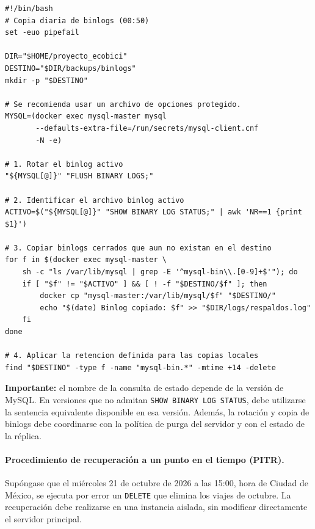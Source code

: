 \documentclass[10pt,a4paper]{article}
\begin{document}
\begin{lstlisting}
#!/bin/bash
# Copia diaria de binlogs (00:50)
set -euo pipefail

DIR="$HOME/proyecto_ecobici"
DESTINO="$DIR/backups/binlogs"
mkdir -p "$DESTINO"

# Se recomienda usar un archivo de opciones protegido.
MYSQL=(docker exec mysql-master mysql
       --defaults-extra-file=/run/secrets/mysql-client.cnf
       -N -e)

# 1. Rotar el binlog activo
"${MYSQL[@]}" "FLUSH BINARY LOGS;"

# 2. Identificar el archivo binlog activo
ACTIVO=$("${MYSQL[@]}" "SHOW BINARY LOG STATUS;" | awk 'NR==1 {print $1}')

# 3. Copiar binlogs cerrados que aun no existan en el destino
for f in $(docker exec mysql-master \
    sh -c "ls /var/lib/mysql | grep -E '^mysql-bin\\.[0-9]+$'"); do
    if [ "$f" != "$ACTIVO" ] && [ ! -f "$DESTINO/$f" ]; then
        docker cp "mysql-master:/var/lib/mysql/$f" "$DESTINO/"
        echo "$(date) Binlog copiado: $f" >> "$DIR/logs/respaldos.log"
    fi
done

# 4. Aplicar la retencion definida para las copias locales
find "$DESTINO" -type f -name "mysql-bin.*" -mtime +14 -delete
\end{lstlisting}

\textbf{Importante:} el nombre de la consulta de estado depende de la versión de MySQL. En versiones que no admitan \texttt{SHOW BINARY LOG STATUS}, debe utilizarse la sentencia equivalente disponible en esa versión. Además, la rotación y copia de binlogs debe coordinarse con la política de purga del servidor y con el estado de la réplica.

\newpage

\paragraph{Procedimiento de recuperación a un punto en el tiempo (PITR).}
Supóngase que el miércoles 21 de octubre de 2026 a las 15:00, hora de Ciudad de México, se ejecuta por error un \texttt{DELETE} que elimina los viajes de octubre. La recuperación debe realizarse en una instancia aislada, sin modificar directamente el servidor principal.
\end{document}
